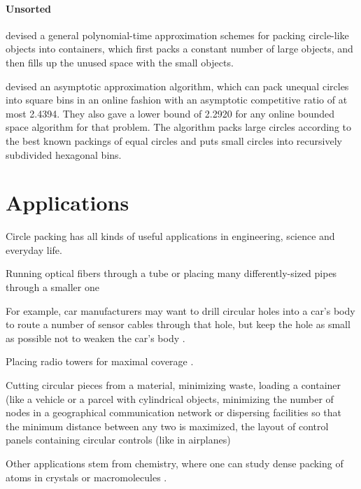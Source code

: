 \paragraph{Unsorted}

\textcite{MPSSW2014polynomial} devised a general polynomial-time approximation schemes for packing circle-like objects into containers, which first packs a constant number of large objects, and then fills up the unused space with the small objects.

\textcite{HMS2016bounded} devised an asymptotic approximation algorithm, which can pack unequal circles into square bins in an online fashion with an asymptotic competitive ratio of at most 2.4394. They also gave a lower bound of 2.2920 for any online bounded space algorithm for that problem. The algorithm packs large circles according to the best known packings of equal circles and puts small circles into recursively subdivided hexagonal bins.

\section{Applications}

Circle packing has all kinds of useful applications in engineering, science and everyday life.


Running optical fibers through a tube or placing many differently-sized pipes through a smaller one \parencite{WHZX2002improved}

For example, car manufacturers may want to drill circular holes into a car's body to route a number of sensor cables through that hole, but keep the hole as small as possible not to weaken the car's body \cite{SSSKK2004disk}.

Placing radio towers for maximal coverage \parencite{SMCSCG2007new}.

Cutting circular pieces from a material, minimizing waste, loading a container (like a vehicle or a parcel with cylindrical objects, minimizing the number of nodes in a geographical communication network or dispersing facilities so that the minimum distance between any two is maximized, the layout of control panels containing circular controls (like in airplanes) \parencite{CKP2008solving}

Other applications stem from chemistry, where one can study dense packing of atoms in crystals or macromolecules \cite{WMP1994history}.

